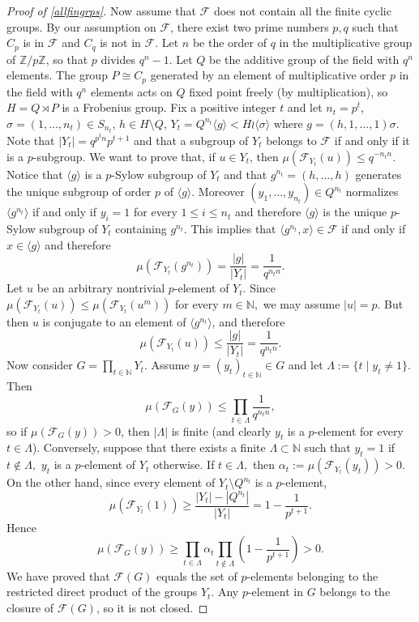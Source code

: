 \documentclass{amsart}
\numberwithin{equation}{section}
\begin{document}
\begin{proof}[Proof of \cref{allfingrps}]
Now assume that $\mathcal F$ does not contain all the finite cyclic groups. By our assumption on $\mathcal F$, there exist two prime numbers $p,q$ such that $C_p$ is in $\mathcal F$ and $C_q$ is not in $\mathcal F$. Let $n$ be the order of $q$ in the multiplicative group of $\mathbb{Z}/p\mathbb{Z}$, so that $p$ divides $q^n-1$. Let $Q$ be the additive group of the field with $q^n$ elements. The group $P \cong C_p$ generated by an element of multiplicative order $p$ in the field with $q^n$ elements acts on $Q$ fixed point freely (by multiplication), so $H=Q \rtimes P$ is a Frobenius group. Fix a positive integer $t$ and let $n_t=p^t$, $\sigma=(1,\ldots,n_t) \in S_{n_t}$, $h \in H \setminus Q$, $Y_t= Q^{n_t} \langle g \rangle < H \wr \langle \sigma \rangle$ where $g=(h,1,\ldots,1)\sigma$. Note that $|Y_t| = q^{p^t n} p^{t+1}$ and that a subgroup of $Y_t$ belongs to $\mathcal{F}$ if and only if it is a $p$-subgroup.
We want to prove that, if $u \in Y_t$, then $\mu(\mathcal F_{Y_t}(u)) \leq q^{-{n_tn}}.$ %
Notice that $\langle g\rangle $ is a $p$-Sylow subgroup of $Y_t$ and that $g^{n_t}=(h,\dots,h)$ generates the unique subgroup of order $p$ of $\langle g \rangle.$ Moreover
$(y_1,\dots,y_{n_t})\in Q^{n_t}$ normalizes $\langle g^{n_t}\rangle $ if and only if $y_i=1$ for every $1\leq i\leq n_t$ and therefore $\langle g\rangle$ is the unique $p$-Sylow subgroup of $Y_t$ containing $g^{n_t}.$ This implies that  $\langle g^{n_t}, x\rangle \in \mathcal{F}$ if and only if $x \in \langle g\rangle$ and therefore $$\mu(\mathcal{F}_{Y_t}(g^{n_t}))=\frac{|g|}{|Y_t|}=\frac{1}{q^{n_tn}}.$$
Let $u$ be an arbitrary nontrivial $p$-element of $Y_t$. 
Since $\mu(\mathcal{F}_{Y_t}(u))\leq \mu(\mathcal{F}_{Y_t}(u^m))$ for every $m\in \mathbb N,$ we may assume $|u|=p$. But then $u$ is conjugate to an element of $\langle g^{n_t} \rangle$, and therefore
$$\mu(\mathcal F_{Y_t}(u))\leq \frac{|g|}{|Y_t|}=\frac{1}{q^{n_tn}}.$$
Now consider $G=\prod_{t\in \mathbb N}Y_t$.
Assume $y=(y_t)_{t\in \mathbb N}\in G$ and let $\Lambda:=\{t\mid y_t\neq 1\}.$ Then
$$\mu(\mathcal F_{G}(y))\leq \prod_{t\in \Lambda}\frac{1}{q^{n_tn}},$$ so if $\mu(\mathcal{F}_{G}(y))>0$, then $|\Lambda|$ is finite (and clearly $y_t$ is a $p$-element for every $t\in \Lambda$). Conversely, suppose that there exists a finite $\Lambda \subset \mathbb{N}$ such that $y_t=1$ if $t\notin \Lambda,$ $y_t$ is a $p$-element of $Y_t$ otherwise. If $t\in \Lambda,$ then $\alpha_t:=\mu(\mathcal{F}_{Y_t}(y_t))>0$. On the other hand, since every element of $Y_t \setminus Q^{n_t}$ is a $p$-element, $$\mu(\mathcal{F}_{Y_t}(1)) \geq \frac{|Y_t|-|Q^{n_t}|}{|Y_t|} = 1-\frac{1}{p^{t+1}}.$$ Hence
$$\mu(\mathcal F_{G}(y))\geq \prod_{t\in \Lambda}\alpha_t
\prod_{t\notin \Lambda}\left(1-\frac{1}{p^{t+1}}\right)>0.$$
We have proved that  $\mathcal{F}(G)$ equals the {set of $p$-elements belonging to the restricted direct product of the groups $Y_t$}. Any $p$-element in $G$ belongs to the closure of $\mathcal{F}(G)$, so it is not closed. 
\end{proof}
\end{document}
